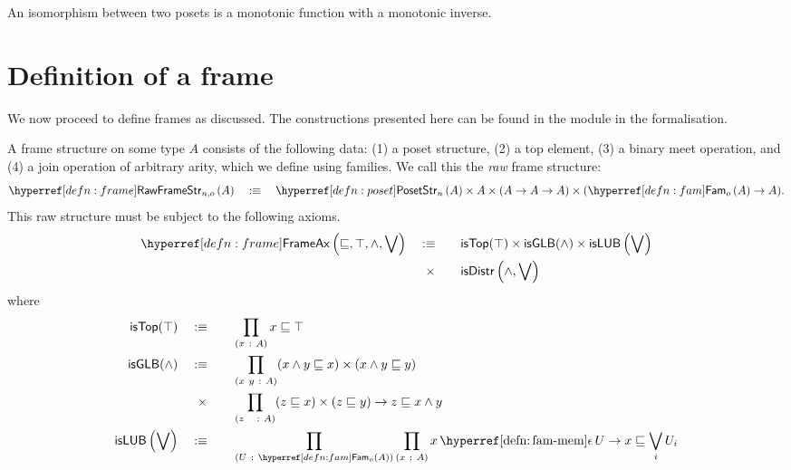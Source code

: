 \begin{defn}\label{defn:poset-iso}
  An isomorphism between two posets is a monotonic function with a monotonic inverse.
\end{defn}

\section{Definition of a frame}\label{sec:frame}

We now proceed to define frames as discussed. The constructions presented here can be
found in the  module in the \veragda{} formalisation.

\begin{defn}[Frame]\label{defn:frame}
  A frame structure on some type $A$ consists of the following data: (1) a poset
  structure, (2) a top element, (3) a binary meet operation, and (4) a join operation of
  arbitrary arity, which we define using families. We call this the \emph{raw} frame
  structure:
  \begin{equation*}
    \rawframestr{n}{o}{A} \quad\is\quad \posetstr{n}{A} \times A \times (A \rightarrow A \rightarrow A) \times (\sub{o}{A} \rightarrow A).
  \end{equation*}
  This raw structure must be subject to the following axioms.
  \begin{alignat*}{2}
    \frameax{\sqsubseteq, \top, \wedge, \bigvee} \quad&\is\quad             &&\mathsf{isTop}(\top) \times
                                              \mathsf{isGLB}(\wedge) \times
                                              \mathsf{isLUB}\left( \bigvee \right)\\
                          &\hspace{0.55em}\times &&\mathsf{isDistr}\left( \wedge, \bigvee \right)
  \end{alignat*}
  where
  \begin{alignat*}{2}
    \mathsf{isTop}(\top) \quad&\is\quad &&\pity{x}{A}{x \sqsubseteq \top}\\
    \mathsf{isGLB}(\wedge) \quad&\is\quad &&\pity{x~y}{A}{(x \wedge y \sqsubseteq x) \times (x \wedge y \sqsubseteq y)}\\
                       &\hspace{0.55em}\times &&\pity{z~~}{A}{(z \sqsubseteq x) \times (z \sqsubseteq y) \rightarrow z \sqsubseteq x \wedge y}\\
    \mathsf{isLUB}\left(\bigvee\right) \quad&\is\quad
         &&\pity{U}{\sub{o}{A}}{\pity{x}{A}{\memfam{x}{U} \rightarrow x \sqsubseteq \bigvee_i U_i}}\\

\end{alignat*}
\end{defn}
